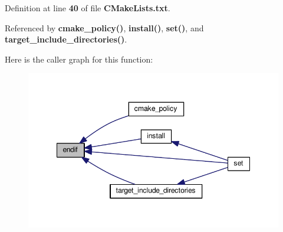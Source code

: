 Definition at line {\bf 40} of file {\bf C\+Make\+Lists.\+txt}.



Referenced by {\bf cmake\+\_\+policy()}, {\bf install()}, {\bf set()}, and {\bf target\+\_\+include\+\_\+directories()}.



Here is the caller graph for this function\+:
\nopagebreak
\begin{figure}[H]
\begin{center}
\leavevmode
\includegraphics[width=348pt]{d0/dbf/src_2CMakeLists_8txt_a69654e14809bcd80e936600cffe6ed56_icgraph}
\end{center}
\end{figure}


